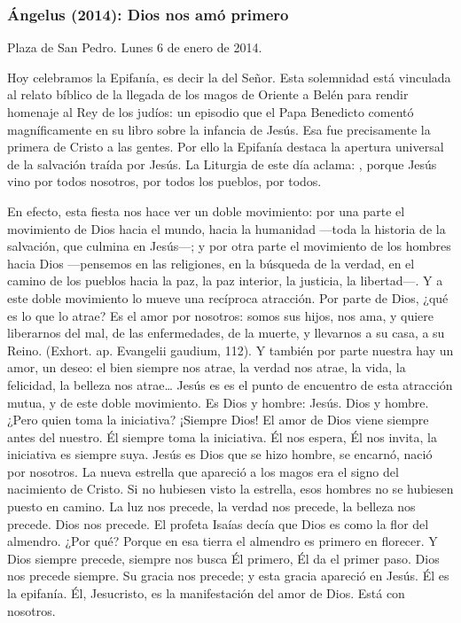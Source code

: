 \begin{body}
\begin{body}
{\subsubsection{Ángelus (2014): Dios nos amó primero}

Plaza de San Pedro. Lunes 6 de enero de 2014.

Hoy celebramos la Epifanía, es decir la  del Señor. Esta solemnidad está vinculada al relato bíblico de la llegada de los magos de Oriente a Belén para rendir homenaje al Rey de los judíos: un episodio que el Papa Benedicto comentó magníficamente en su libro sobre la infancia de Jesús. Esa fue precisamente la primera  de Cristo a las gentes. Por ello la Epifanía destaca la apertura universal de la salvación traída por Jesús. La Liturgia de este día aclama: , porque Jesús vino por todos nosotros, por todos los pueblos, por todos.

En efecto, esta fiesta nos hace ver un doble movimiento: por una parte el movimiento de Dios hacia el mundo, hacia la humanidad ---toda la historia de la salvación, que culmina en Jesús---; y por otra parte el movimiento de los hombres hacia Dios ---pensemos en las religiones, en la búsqueda de la verdad, en el camino de los pueblos hacia la paz, la paz interior, la justicia, la libertad---. Y a este doble movimiento lo mueve una recíproca atracción. Por parte de Dios, ¿qué es lo que lo atrae? Es el amor por nosotros: somos sus hijos, nos ama, y quiere liberarnos del mal, de las enfermedades, de la muerte, y llevarnos a su casa, a su Reino.  (Exhort. ap. Evangelii gaudium, 112). Y también por parte nuestra hay un amor, un deseo: el bien siempre nos atrae, la verdad nos atrae, la vida, la felicidad, la belleza nos atrae\ldots{} Jesús es es el punto de encuentro de esta atracción mutua, y de este doble movimiento. Es Dios y hombre: Jesús. Dios y hombre. ¿Pero quien toma la iniciativa? ¡Siempre Dios! El amor de Dios viene siempre antes del nuestro. Él siempre toma la iniciativa. Él nos espera, Él nos invita, la iniciativa es siempre suya. Jesús es Dios que se hizo hombre, se encarnó, nació por nosotros. La nueva estrella que apareció a los magos era el signo del nacimiento de Cristo. Si no hubiesen visto la estrella, esos hombres no se hubiesen puesto en camino. La luz nos precede, la verdad nos precede, la belleza nos precede. Dios nos precede. El profeta Isaías decía que Dios es como la flor del almendro. ¿Por qué? Porque en esa tierra el almendro es primero en florecer. Y Dios siempre precede, siempre nos busca Él primero, Él da el primer paso. Dios nos precede siempre. Su gracia nos precede; y esta gracia apareció en Jesús. Él es la epifanía. Él, Jesucristo, es la manifestación del amor de Dios. Está con nosotros.

}
\end{body}
\end{body}
